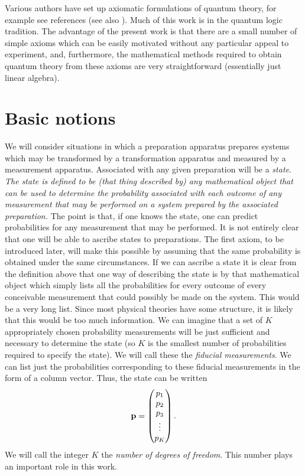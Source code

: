\documentclass[10pt]{article}
\begin{document}
Various authors have set up axiomatic formulations of quantum
theory, for example see references
\cite{birkoff,mackey,piron,ludwig,mielnik,lande,fivel,accardi,landsman,cmw}
(see
also \cite{gleason,kochen,pitowsky}). Much of this work is in the quantum logic
tradition.  The advantage of the present work is that there
are a small number of simple axioms which can be easily
motivated without any particular appeal to experiment,
and, furthermore, the mathematical methods required to obtain quantum
theory from
these axioms are very straightforward (essentially just linear algebra).


\section{Basic notions}\label{basicnotions}

We will consider
situations in which a preparation apparatus prepares systems which may
be transformed by a transformation apparatus and measured by a
measurement apparatus.  Associated with any given preparation will be a
{\it state}.  {\it The state is defined to be (that thing described by) any
mathematical object that can be used to determine the probability
associated with each outcome of any measurement that may be performed on
a system prepared by the associated preparation.} The point is that, if
one knows the state, one can predict probabilities for any
measurement that may be performed.  It is not entirely
clear that one will be able to ascribe states to preparations. The first
axiom, to be introduced later, will make this possible by assuming that
the same probability is obtained under the same circumstances.  If we
can ascribe a state it is clear from the definition above that one way
of describing the state is by that
mathematical object which simply lists all the probabilities for every
outcome of every conceivable measurement that could possibly be made on
the system.  This would be a very long list. Since most
physical theories have some structure, it is likely that this would be
too much information.  We can imagine that a set of $K$ appropriately chosen
probability measurements will be just sufficient and necessary to
determine the state (so $K$ is the smallest number of probabilities
required to specify the state). We will call these the
{\it fiducial measurements}.
We can list just the probabilities corresponding to these fiducial
measurements in the form of a column vector. Thus, the state can be written
\begin{equation}
  {\bf p} = \left(
  \begin{matrix} p_1 \\ p_2 \\ p_3 \\ \vdots \\ p_K \end{matrix}
  \right).
\end{equation}
We will call the integer $K$ the {\it number of degrees of freedom}. This
number plays an important role in this work.
\end{document}
